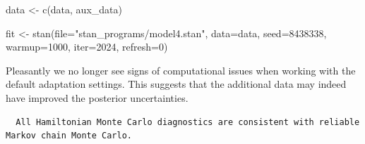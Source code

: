 \documentclass[
  letterpaper,
  DIV=11,
  numbers=noendperiod]{scrartcl}
\newenvironment{Shaded}{\begin{snugshade}}{\end{snugshade}}
\newcommand{\AttributeTok}[1]{\textcolor[rgb]{0.40,0.45,0.13}{#1}}
\newcommand{\DecValTok}[1]{\textcolor[rgb]{0.68,0.00,0.00}{#1}}
\newcommand{\FunctionTok}[1]{\textcolor[rgb]{0.28,0.35,0.67}{#1}}
\newcommand{\NormalTok}[1]{\textcolor[rgb]{0.00,0.23,0.31}{#1}}
\newcommand{\OtherTok}[1]{\textcolor[rgb]{0.00,0.23,0.31}{#1}}
\newcommand{\SpecialCharTok}[1]{\textcolor[rgb]{0.37,0.37,0.37}{#1}}
\newcommand{\StringTok}[1]{\textcolor[rgb]{0.13,0.47,0.30}{#1}}
\begin{document}
\begin{Shaded}
\begin{Highlighting}[]
\NormalTok{data }\OtherTok{\textless{}{-}} \FunctionTok{c}\NormalTok{(data, aux\_data)}

\NormalTok{fit }\OtherTok{\textless{}{-}} \FunctionTok{stan}\NormalTok{(}\AttributeTok{file=}\StringTok{"stan\_programs/model4.stan"}\NormalTok{,}
            \AttributeTok{data=}\NormalTok{data, }\AttributeTok{seed=}\DecValTok{8438338}\NormalTok{,}
            \AttributeTok{warmup=}\DecValTok{1000}\NormalTok{, }\AttributeTok{iter=}\DecValTok{2024}\NormalTok{, }\AttributeTok{refresh=}\DecValTok{0}\NormalTok{)}
\end{Highlighting}
\end{Shaded}

Pleasantly we no longer see signs of computational issues when working
with the default adaptation settings. This suggests that the additional
data may indeed have improved the posterior uncertainties.

\begin{Shaded}
\end{Shaded}

\begin{verbatim}
  All Hamiltonian Monte Carlo diagnostics are consistent with reliable
Markov chain Monte Carlo.
\end{verbatim}

\begin{Shaded}
\end{Shaded}
\end{document}
